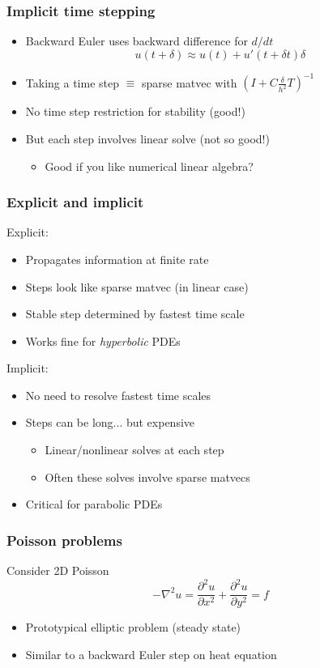 \documentclass{beamer}
\begin{document}
\begin{frame}
  \frametitle{Implicit time stepping}

  \begin{itemize}
  \item Backward Euler uses backward difference for $d/dt$
    \[
      u(t+\delta) \approx u(t) + u'(t + \delta t) \delta
    \]
  \item Taking a time step $\equiv$ sparse matvec with
    $\left( I + C \frac{\delta}{h^2} T \right)^{-1}$
  \item No time step restriction for stability (good!)
  \item But each step involves linear solve (not so good!)
    \begin{itemize}
    \item Good if you like numerical linear algebra?
    \end{itemize}
  \end{itemize}

\end{frame}


\begin{frame}
  \frametitle{Explicit and implicit}

  Explicit:
  \begin{itemize}
  \item Propagates information at finite rate
  \item Steps look like sparse matvec (in linear case)
  \item Stable step determined by fastest time scale
  \item Works fine for {\em hyperbolic} PDEs
  \end{itemize}

  Implicit:
  \begin{itemize}
  \item No need to resolve fastest time scales
  \item Steps can be long... but expensive
    \begin{itemize}
    \item Linear/nonlinear solves at each step
    \item Often these solves involve sparse matvecs
    \end{itemize}
  \item Critical for parabolic PDEs
  \end{itemize}
\end{frame}


\begin{frame}
  \frametitle{Poisson problems}

  Consider 2D Poisson
  \[
  -\nabla^2 u = 
    \frac{\partial^2 u}{\partial x^2} + 
    \frac{\partial^2 u}{\partial y^2} = f
  \]

  \begin{itemize}
  \item Prototypical elliptic problem (steady state)
  \item Similar to a backward Euler step on heat equation
  \end{itemize}
\end{frame}
\end{document}
